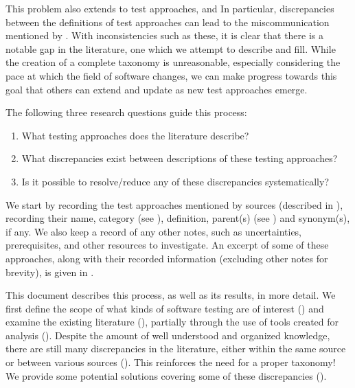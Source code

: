     This problem also extends to test approaches, and
\else
    In particular,
\fi
discrepancies between the definitions of test approaches can lead to the
miscommunication mentioned by \citet[p.~7]{KanerEtAl2011}. \tourDiscrep{}
\loadDiscrep{} \alphaDiscrep{} With inconsistencies such as these, it is clear
that there is a notable gap in the literature, one which we attempt to describe
and fill. While the creation of a complete taxonomy is unreasonable, especially
considering the pace at which the field of software changes, we can make
progress towards this goal that others can extend and update as new test
approaches emerge.

\ifnotpaper
    The following three research questions guide this process:
    \begin{enumerate}
        \item What testing approaches does the literature describe?
        \item What discrepancies exist between descriptions of these testing
              approaches?
        \item Is it possible to resolve/reduce any of these discrepancies
              systematically?
    \end{enumerate}
    We start by recording the \approachCount{} test approaches mentioned by
    \srcCount{} sources (described in ), recording their name,
    category (see ), definition, parent(s)
    (see ) and synonym(s), if any. We also keep a
    record of any other notes, such as uncertainties, prerequisites, and other
    resources to investigate. An excerpt of some of these approaches, along
    with their recorded information (excluding other notes for brevity), is
    given in .
\fi

This document describes this process, as well as its results, in more detail.
We first define the scope of
what kinds of software testing are of interest () and examine the
existing literature ()\ifnotpaper, partially through the use
of tools created for analysis ()\fi. Despite the amount of well
understood and organized knowledge, there are still many discrepancies in the
literature, either within the same source or between various
sources (). This reinforces the need for a proper taxonomy! We
provide some potential solutions covering some of these discrepancies
().

\ifnotpaper
    \begin{bigLandscape}
        
    \end{bigLandscape}
\fi